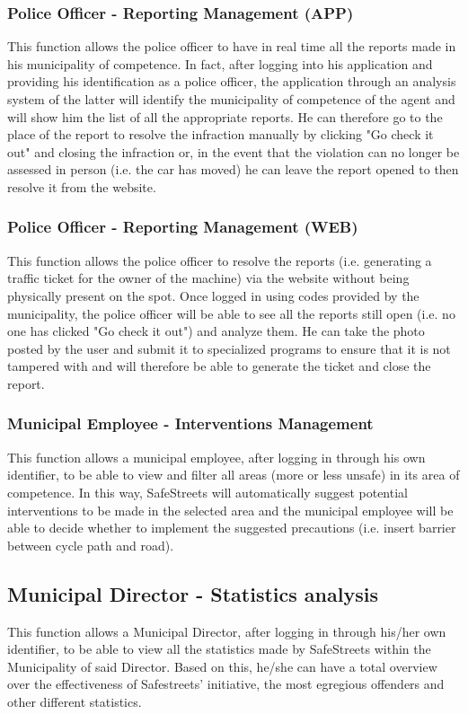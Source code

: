 \documentclass{article}
\begin{document}
    \subsubsection{Police Officer - Reporting Management (APP)}
    This function allows the police officer to have in real time all the reports
    made in his municipality of competence. In fact, after logging into his
    application and providing his identification as a police officer, the
    application through an analysis system of the latter will identify the
    municipality of competence of the agent and will show him the list of all
    the appropriate reports. He can therefore go to the place of the report to
    resolve the infraction manually by clicking "Go check it out" and closing the
    infraction or, in the event that the violation can no longer be assessed in
    person (i.e. the car has moved) he can leave the report opened to then
    resolve it from the website.

    \subsubsection{Police Officer - Reporting Management (WEB)}
    This function allows the police officer to resolve the reports (i.e.
    generating a traffic ticket for the owner of the machine) via the website
    without being physically present on the spot. Once logged in using codes
    provided by the municipality, the police officer will be able to see all the
    reports still open (i.e. no one has clicked "Go check it out") and analyze
    them. He can take the photo posted by the user and submit it to specialized
    programs to ensure that it is not tampered with and will therefore be able
    to generate the ticket and close the report.

    \subsubsection{Municipal Employee - Interventions Management}
    This function allows a municipal employee, after logging in through his own
    identifier, to be able to view and filter all areas (more or less unsafe) in
    its area of competence. In this way, SafeStreets will automatically suggest
    potential interventions to be made in the selected area and the municipal
    employee will be able to decide whether to implement the suggested
    precautions (i.e. insert barrier between cycle path and road).

    \subsection{Municipal Director - Statistics analysis}
    This function allows a Municipal Director, after logging in through his/her
    own identifier, to be able to view all the statistics made by SafeStreets
    within the Municipality of said Director. Based on this, he/she can have a
    total overview over the effectiveness of Safestreets' initiative, the most
    egregious offenders and other different statistics.
\end{document}
